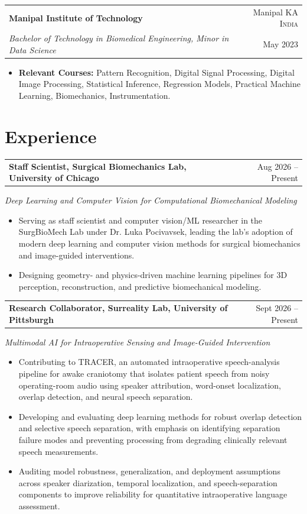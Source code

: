 \documentclass[letterpaper,10pt]{article}
\newcommand{\cvItem}[1]{\item\small{#1}}
\newcommand{\cvSubheading}[4]{
  \vspace{1pt}
  \begin{tabularx}{\textwidth}{X r}
    \textbf{#1} & #2 \\
    \textit{\small #3} & \small #4 \\
  \end{tabularx}
  \vspace{-2pt}
}
\newcommand{\cvProjectHeading}[2]{
  \vspace{2pt}
  \begin{tabularx}{\textwidth}{X r}
    \textbf{#1} & \small #2 \\
  \end{tabularx}
  \vspace{-2pt}
}
\newcommand{\cvItemListStart}{
  \begin{itemize}[leftmargin=0.16in, itemsep=1.5pt, parsep=0pt, topsep=2pt]
}
\newcommand{\cvItemListEnd}{
  \end{itemize}
  \vspace{2pt}
}
\begin{document}
\cvSubheading
  {Manipal Institute of Technology}{Manipal KA \textsc{India}}
  {Bachelor of Technology in Biomedical Engineering, Minor in Data Science}{May 2023}
\cvItemListStart
  \cvItem{\textbf{Relevant Courses:} Pattern Recognition, Digital Signal Processing, Digital Image Processing, Statistical Inference, Regression Models, Practical Machine Learning, Biomechanics, Instrumentation.}
\cvItemListEnd

\section{Experience}

\cvProjectHeading{Staff Scientist, Surgical Biomechanics Lab, University of Chicago}{Aug 2026 -- Present}
\textit{\small Deep Learning and Computer Vision for Computational Biomechanical Modeling}
\cvItemListStart
  \cvItem{Serving as staff scientist and computer vision/ML researcher in the SurgBioMech Lab under Dr. Luka Pocivavsek, leading the lab's adoption of modern deep learning and computer vision methods for surgical biomechanics and image-guided interventions.}
  \cvItem{Designing geometry- and physics-driven machine learning pipelines for 3D perception, reconstruction, and predictive biomechanical modeling.}
\cvItemListEnd

\cvProjectHeading{Research Collaborator, Surreality Lab, University of Pittsburgh}{Sept 2026 -- Present}
\textit{\small Multimodal AI for Intraoperative Sensing and Image-Guided Intervention}
\cvItemListStart
\cvItem{Contributing to \textsc{TRACER}, an automated intraoperative speech-analysis pipeline for awake craniotomy that isolates patient speech from noisy operating-room audio using speaker attribution, word-onset localization, overlap detection, and neural speech separation.}
\cvItem{Developing and evaluating deep learning methods for robust overlap detection and selective speech separation, with emphasis on identifying separation failure modes and preventing processing from degrading clinically relevant speech measurements.}
\cvItem{Auditing model robustness, generalization, and deployment assumptions across speaker diarization, temporal localization, and speech-separation components to improve reliability for quantitative intraoperative language assessment.}
\cvItemListEnd
\end{document}
